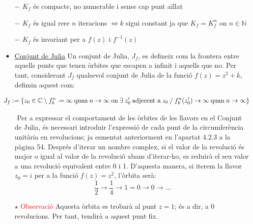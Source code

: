 \documentclass[12pt]{report}
\begin{document}
    \begin{itemize}
        \item [$-$] $K_f$ és compacte, no numerable i sense cap punt aïllat
        \item [$-$] $K_f$ és igual rere $n$ iteracions $\Leftrightarrow k$ sigui constant ja que $K_f=K^n_f$ on $n \in \mathbb{N}$
         \item [$-$] $K_f$ és invariant per a $f(z)$ i $f^{-1}(z)$
   
    \item \underline{Conjunt de Julia}
    \newline
    Un conjunt de Julia, $J_f$, es defineix com la frontera entre aquells punts que tenen òrbites que escapen a infinit i aquells que no.
    \newline
    Per tant, considerant $J_f$ qualsevol conjunt de Julia de la funció $f(z)=z^2+k$, defimin aquest com:
   \end{itemize} 
   $$ J_f := \{ z_0 \in \mathbb{C} \hspace{0.25em} \backslash \hspace{0.25em} f^n_k \nrightarrow \infty \hspace{0.25em} \text{quan} \hspace{0.25em} n \rightarrow \infty \hspace{0.25em} \text{on} \hspace{0.25em} \exists \hspace{0.25em} z'_0 \hspace{0.25em} \text{adjecent a} \hspace{0.25em} z_0 \hspace{0.25em} / \hspace{0.25em} f^n_k(z'_0) \rightarrow \infty \hspace{0.25em} \text{quan} \hspace{0.25em} n \rightarrow \infty \}$$
\begin{itemize}
    \item [$ $] Per a expressar el comportament de les òrbites de les llavors en el Conjunt de Julia, és necessari introduir l'expressió de cada punt de la circumferència unitària en revolucions; ja esmentat anteriorment en l'apartat 4.2.3 a la pàgina 54.
    \newline
    Després d'iterar un nombre complex, si el valor de la revolució és major o igual al valor de la revolució abans d'iterar-ho, es reduirà el seu valor a una revolució equivalent entre 0 i 1.
    \newline
    D'aquesta manera, si iterem la llavor $z_0=i$ per a la funció $f(z)=z^2$, l'òrbita serà:
    $$\frac{1}{2} \rightarrow \frac{1}{4} \rightarrow 1 = 0 \rightarrow 0 \rightarrow ...$$
    \item [$\star$] \textcolor{red}{Observació}
    \newline
    Aquesta òrbita es trobarà al punt $z=1$; és a dir, a 0 revolucions. Per tant, tendirà a aquest punt fix.
\end{itemize}
\end{document}
